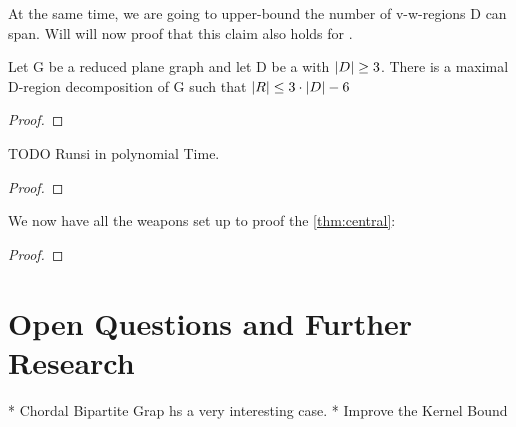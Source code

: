 At the same time, we are going to upper-bound the number of v-w-regions D can span. Will will now proof that this claim also holds for \sdom. 

\begin{lemma}
    Let G be a reduced plane graph and let D be a \sdom with $\abs{D}\geq 3$. There is a maximal D-region decomposition of G such that $\abs{R} \leq 3 \cdot \abs{D} - 6$
\end{lemma}

\begin{proof} 
\end{proof}


\begin{lemma}
TODO Runsi in polynomial Time. 
\end{lemma}
\begin{proof} 
\end{proof}

We now have all the weapons set up to proof the \cref{thm:central}: 

\centraltheo*
\begin{proof}
\end{proof}

\chapter{Open Questions and Further Research}

* Chordal Bipartite Grap hs a very interesting case.
* Improve the Kernel Bound